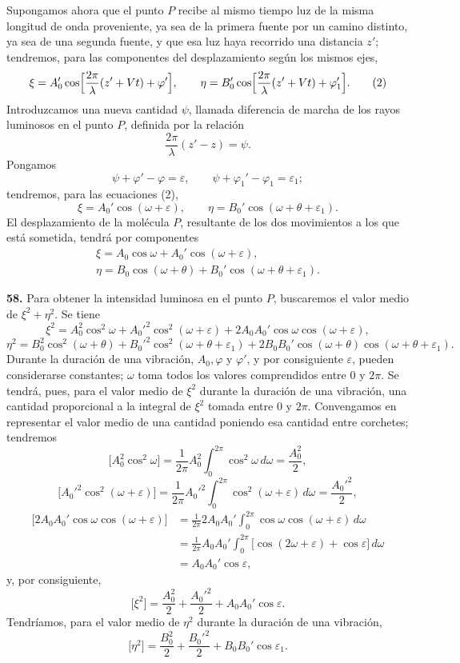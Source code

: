 Supongamos ahora que el punto $P$ recibe al mismo tiempo luz de la misma
longitud de onda proveniente, ya sea de la primera fuente por un camino
distinto, ya sea de una segunda fuente, y que esa luz haya recorrido una
distancia $z'$; tendremos, para las componentes del desplazamiento según
los mismos ejes,
\begin{equation}
\xi=A_0'\cos\Bigl[\frac{2\pi}{\lambda}(z'+Vt)+\varphi'\Bigr],\qquad
\eta=B_0'\cos\Bigl[\frac{2\pi}{\lambda}(z'+Vt)+\varphi_1'\Bigr].
\tag{2}
\end{equation}
Introduzcamos una nueva cantidad $\psi$, llamada diferencia de marcha de
los rayos luminosos en el punto $P$, definida por la relación
\[
\frac{2\pi}{\lambda}(z'-z)=\psi.
\]
Pongamos
\[
\psi+\varphi'-\varphi=\varepsilon,\qquad \psi+\varphi_1'-\varphi_1=\varepsilon_1;
\]
tendremos, para las ecuaciones (2),
\[
\xi=A_0'\cos(\omega+\varepsilon),\qquad \eta=B_0'\cos(\omega+\theta+\varepsilon_1).
\]
El desplazamiento de la molécula $P$, resultante de los dos movimientos a
los que está sometida, tendrá por componentes
\begin{equation}
\begin{gathered}
\xi=A_0\cos\omega+A_0'\cos(\omega+\varepsilon),\\
\eta=B_0\cos(\omega+\theta)+B_0'\cos(\omega+\theta+\varepsilon_1).
\end{gathered}
\tag{3}
\end{equation}

\noindent\textbf{58.} Para obtener la intensidad luminosa en el punto $P$,
buscaremos el valor medio de $\xi^2+\eta^2$. Se tiene
\[
\xi^2=A_0^2\cos^2\omega+A_0'^2\cos^2(\omega+\varepsilon)
+2A_0A_0'\cos\omega\cos(\omega+\varepsilon),
\]
\[
\eta^2=B_0^2\cos^2(\omega+\theta)+B_0'^2\cos^2(\omega+\theta+\varepsilon_1)
+2B_0B_0'\cos(\omega+\theta)\cos(\omega+\theta+\varepsilon_1).
\]
Durante la duración de una vibración, $A_0,\varphi$ y $\varphi'$, y por
consiguiente $\varepsilon$, pueden considerarse constantes; $\omega$ toma
todos los valores comprendidos entre $0$ y $2\pi$. Se tendrá, pues, para
el valor medio de $\xi^2$ durante la duración de una vibración, una
cantidad proporcional a la integral de $\xi^2$ tomada entre $0$ y $2\pi$.
Convengamos en representar el valor medio de una cantidad poniendo esa
cantidad entre corchetes; tendremos
\[
\bigl[A_0^2\cos^2\omega\bigr]
= \frac{1}{2\pi}A_0^2\int_0^{2\pi}\cos^2\omega\,d\omega=\frac{A_0^2}{2},
\]
\[
\bigl[A_0'^2\cos^2(\omega+\varepsilon)\bigr]
= \frac{1}{2\pi}A_0'^2\int_0^{2\pi}\cos^2(\omega+\varepsilon)\,d\omega
=\frac{A_0'^2}{2},
\]
\begin{align*}
\bigl[2A_0A_0'\cos\omega\cos(\omega+\varepsilon)\bigr]
&= \frac{1}{2\pi}2A_0A_0'\int_0^{2\pi}\cos\omega\cos(\omega+\varepsilon)\,d\omega\\
&= \frac{1}{2\pi}A_0A_0'\int_0^{2\pi}\bigl[\cos(2\omega+\varepsilon)+\cos\varepsilon\bigr]\,d\omega\\
&= A_0A_0'\cos\varepsilon,
\end{align*}
y, por consiguiente,
\[
\bigl[\xi^2\bigr]=\frac{A_0^2}{2}+\frac{A_0'^2}{2}+A_0A_0'\cos\varepsilon.
\]
Tendríamos, para el valor medio de $\eta^2$ durante la duración de una
vibración,
\[
\bigl[\eta^2\bigr]=\frac{B_0^2}{2}+\frac{B_0'^2}{2}+B_0B_0'\cos\varepsilon_1.
\]

